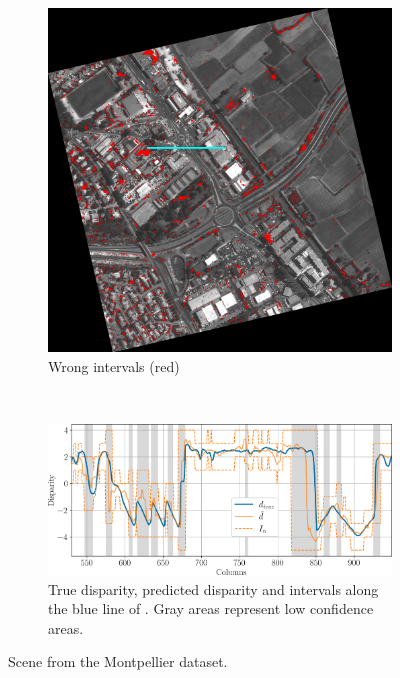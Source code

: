\begin{figure}
\begin{subfigure}[t]{0.5\linewidth}
        \includegraphics[width=\linewidth]{Images/Chap_5/MTP_291_error.png}
        \caption{Wrong intervals (red)}
        \label{fig:mtp_291_b}
    \end{subfigure}\\
    \begin{subfigure}[t]{1\linewidth}
        \centering
        \includegraphics[width=\linewidth]{Images/Chap_5/MTP_291_error_row_750.png}
        \caption{True disparity, predicted disparity and intervals along the blue line of . Gray areas represent low confidence areas.}
        \label{fig:mtp_291_c}
    \end{subfigure}
    \caption{Scene from the Montpellier dataset.}
    \label{fig:mtp_291}
\end{figure}

